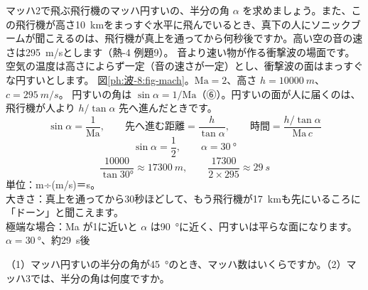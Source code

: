 \label{ph:波-8:ex10}
\begin{phreidai}
マッハ2で飛ぶ飛行機のマッハ円すいの、半分の角 $\alpha$ を求めましょう。また、この飛行機が高さ\qty{10}{km}をまっすぐ水平に飛んでいるとき、真下の人にソニックブームが聞こえるのは、飛行機が真上を通ってから何秒後ですか。高い空の音の速さは\qty{295}{m/s}とします（熱-4 例題9）。
\phbamen
音より速い物が作る衝撃波の場面です。
\phmushi
空気の温度は高さによらず一定（音の速さが一定）とし、衝撃波の面はまっすぐな円すいとします。
\phzu
図\ref{ph:波-8:fig-mach}。$\mathrm{Ma}=2$、高さ $h=\qty{10000}{m}$、$c=\qty{295}{m/s}$。
\phriyu
円すいの角は $\sin\alpha=1/\mathrm{Ma}$（⑥）。円すいの面が人に届くのは、飛行機が人より $h/\tan\alpha$ 先へ進んだときです。
\phtateru
\[\sin\alpha=\frac{1}{\mathrm{Ma}},\qquad\text{先へ進む距離}=\frac{h}{\tan\alpha},\qquad\text{時間}=\frac{h/\tan\alpha}{\mathrm{Ma}\,c}\]
\phtoku
\[\sin\alpha=\frac12,\qquad\alpha=\qty{30}{\degree}\]
\[\frac{10000}{\tan30°}\approx\qty{17300}{m},\qquad\frac{17300}{2\times295}\approx\qty{29}{s}\]
\phtashikame
単位：m÷(m/s)＝s。\\
大きさ：真上を通ってから30秒ほどして、もう飛行機が\qty{17}{km}も先にいるころに「ドーン」と聞こえます。\\
極端な場合：Ma が1に近いと $\alpha$ は\qty{90}{\degree}に近く、円すいは平らな面になります。
\kotae $\alpha=\qty{30}{\degree}$、約\qty{29}{s}後
\end{phreidai}
\begin{jibun}
（1）マッハ円すいの半分の角が\qty{45}{\degree}のとき、マッハ数はいくらですか。（2）マッハ3では、半分の角は何度ですか。
\end{jibun}

